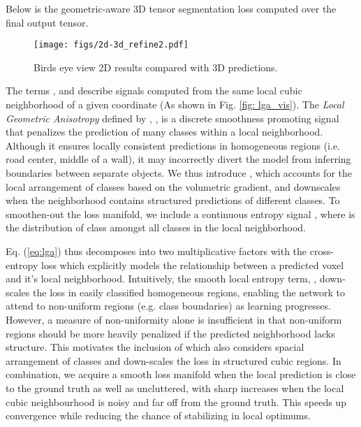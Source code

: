 \documentclass{article}
\begin{document}
Below is the geometric-aware 3D tensor segmentation loss computed over the final output tensor.




\setlength{\columnsep}{5pt}\begin{wrapfigure}{r}{4cm}
  \centering
  \texttt{[image: figs/2d-3d\_refine2.pdf]}
\captionsetup{font=scriptsize,labelfont=scriptsize}
  \caption{Birds eye view 2D results compared with 3D predictions.}
  \label{fig: 2dvs3d}
  \vspace{-15px}
\end{wrapfigure}

The terms ,  and  describe signals computed from the same local cubic neighborhood of a given coordinate (As shown in Fig. \ref{fig: lga_vis}). The \textit{Local Geometric Anisotropy} defined by \citet{li2019depth}, , is a discrete smoothness promoting signal that penalizes the prediction of many classes within a local neighborhood. Although it ensures locally consistent predictions in homogeneous regions (i.e. road center, middle of a wall), it may incorrectly divert the model from inferring boundaries between separate objects. We thus introduce , which accounts for the local arrangement of classes based on the volumetric gradient, and downscales  when the neighborhood contains structured predictions of different classes. To smoothen-out the loss manifold, we include a continuous entropy signal , where  is the distribution of class  amongst all classes  in the local neighborhood. 

Eq. (\ref{eq:lga}) thus decomposes into two multiplicative factors with the cross-entropy loss which explicitly models the relationship between a predicted voxel and it's local neighborhood. Intuitively, the smooth local entropy term, , down-scales the loss in easily classified homogeneous regions, enabling the network to attend to non-uniform regions (e.g. class boundaries) as learning progresses. However, a measure of non-uniformity alone is insufficient in that non-uniform regions should be more heavily penalized if the predicted neighborhood lacks structure. This motivates the inclusion of  which also considers spacial arrangement of classes and down-scales the loss in structured cubic regions. In combination, we acquire a smooth loss manifold when the local prediction is close to the ground truth as well as uncluttered, with sharp increases when the local cubic neighbourhood is noisy and far off from the ground truth. This speeds up convergence while reducing the chance of stabilizing in local optimums.
\end{document}
